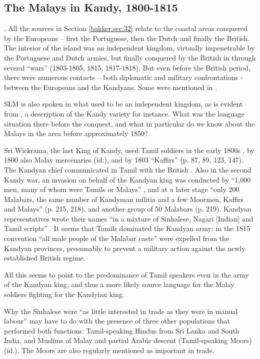 \subsection{The Malays in Kandy, 1800-1815}\label{bakker:sec:33}. 
All the sources in Section \ref{bakker:sec:32} relate to the coastal areas conquered by the Europeans -- first the Portuguese, then the Dutch and finally the British. The interior of the island was an independent kingdom, virtually impenetrable by the Portuguese and Dutch armies, but finally conquered by the British in through several ``wars'' (1803-1805, 1815, 1817-1818). But even before the British period, there were numerous contacts -- both diplomatic and military confrontations - between the Europeans and the Kandyans. Some were mentioned in \label{bakker:sec:31}.

SLM is also spoken in what used to be an independent kingdom, as is evident from  \citet{Nordhoff2009}, a description of the Kandy variety for instance. What was the language situation there before the conquest, and what in particular do we know about the Malays in the area before approximately 1850? 

Sri Wickrama, the last King of Kandy, used Tamil soldiers in the early 1800s \citep[88]{Powell1973},  by 1800 also Malay mercenaries (id.), and  by 1803 ``Kaffirs'' (p. 87, 89, 123, 147). The Kandyan chief communicated in Tamil with the British \citep[125]{Powell1973}. Also in the second Kandy war, an invasion on behalf of the Kandyan king was conducted by ``1,000 men, many of whom were Tamils or Malays'' \citep[204]{Powell1973}, and at a later stage ``only 200 Malabars, the same number of Kandyman militia and a few Moormen, Kaffirs and Malays'' (p. 215, 218), and another group of 50 Malabars (p. 219). Kandyan representatives wrote their names ``in a mixture of Sinhalese, Nagari [Indian] and Tamil scripts'' \citep[231]{Powell1973}. It seems that Tamils dominated the Kandyan army: in the 1815 convention ``all male people of the Malabar caste'' \citep[284]{Powell1973} were expelled from the Kandyan provinces, presumably to prevent a military action against the newly established British regime. 

All this seems to point to the predominance of Tamil speakers even in the army of the Kandyan king, and thus a more likely source language for the Malay soldiers fighting for the Kandyian king. 

Why the Sinhalese were ``as little interested in trade as they were in manual labour'' \citep[56,225]{Powell1973} may have to do with the presence of three other populations that  performed both functions: Tamil-speaking Hindus from Sri Lanka and South India, and Muslims of Malay and partial Arabic descent (Tamil-speaking Moors) (id.). The Moors are also regularly mentioned as important in trade. 

